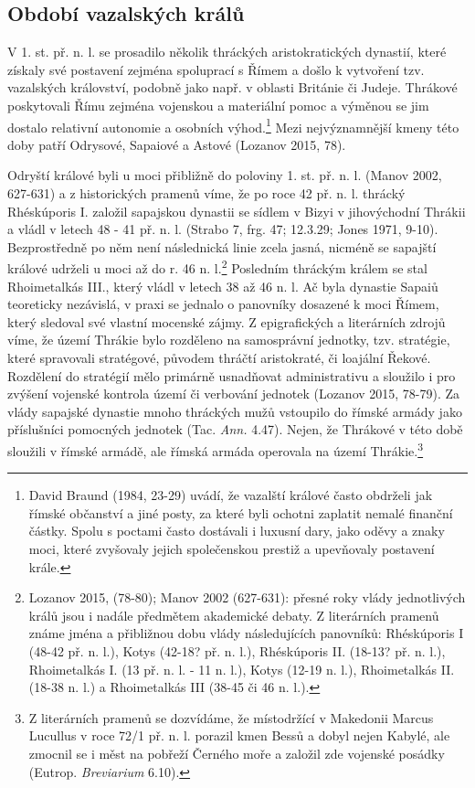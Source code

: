 
\subsection[období-vazalských-králů]{Období vazalských králů}

V 1. st. př. n. l. se prosadilo několik thráckých aristokratických dynastií, které získaly své postavení zejména spoluprací s Římem a došlo k vytvoření tzv. vazalských království, podobně jako např. v oblasti Británie či Judeje. Thrákové poskytovali Římu zejména vojenskou a materiální pomoc a výměnou se jim dostalo relativní autonomie a osobních výhod.\footnote{David Braund (1984, 23-29) uvádí, že vazalští králové často obdrželi jak římské občanství a jiné posty, za které byli ochotni zaplatit nemalé finanční částky. Spolu s poctami často dostávali i luxusní dary, jako oděvy a znaky moci, které zvyšovaly jejich společenskou prestiž a upevňovaly postavení krále.} Mezi nejvýznamnější kmeny této doby patří Odrysové, Sapaiové a Astové (Lozanov 2015, 78).

Odryští králové byli u moci přibližně do poloviny 1. st. př. n. l. (Manov 2002, 627-631) a z historických pramenů víme, že po roce 42 př. n. l. thrácký Rhéskúporis I. založil sapajskou dynastii se sídlem v Bizyi v jihovýchodní Thrákii a vládl v letech 48 - 41 př. n. l. (Strabo 7, frg. 47; 12.3.29; Jones 1971, 9-10). Bezprostředně po něm není následnická linie zcela jasná, nicméně se sapajští králové udrželi u moci až do r. 46 n. l.\footnote{Lozanov 2015, (78-80); Manov 2002 (627-631): přesné roky vlády jednotlivých králů jsou i nadále předmětem akademické debaty. Z literárních pramenů známe jména a přibližnou dobu vlády následujících panovníků: Rhéskúporis I (48-42 př. n. l.), Kotys (42-18? př. n. l.), Rhéskúporis II. (18-13? př. n. l.), Rhoimetalkás I. (13 př. n. l. - 11 n. l.), Kotys (12-19 n. l.), Rhoimetalkás II. (18-38 n. l.) a Rhoimetalkás III (38-45 či 46 n. l.).} Posledním thráckým králem se stal Rhoimetalkás III., který vládl v letech 38 až 46 n. l. Ač byla dynastie Sapaiů teoreticky nezávislá, v praxi se jednalo o panovníky dosazené k moci Římem, který sledoval své vlastní mocenské zájmy. Z epigrafických a literárních zdrojů víme, že území Thrákie bylo rozděleno na samosprávní jednotky, tzv. stratégie, které spravovali stratégové, původem thráčtí aristokraté, či loajální Řekové. Rozdělení do stratégií mělo primárně usnadňovat administrativu a sloužilo i pro zvýšení vojenské kontrola území či verbování jednotek (Lozanov 2015, 78-79). Za vlády sapajské dynastie mnoho thráckých mužů vstoupilo do římské armády jako příslušníci pomocných jednotek (Tac. {\em Ann.} 4.47). Nejen, že Thrákové v této době sloužili v římské armádě, ale římská armáda operovala na území Thrákie.\footnote{Z literárních pramenů se dozvídáme, že místodržící v Makedonii Marcus Lucullus v roce 72/1 př. n. l. porazil kmen Bessů a dobyl nejen Kabylé, ale zmocnil se i měst na pobřeží Černého moře a založil zde vojenské posádky (Eutrop. {\em Breviarium} 6.10).}


